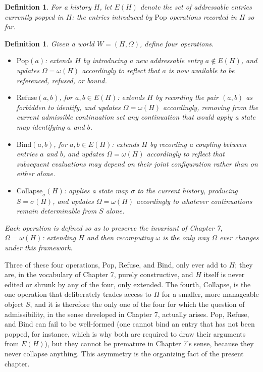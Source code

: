 \documentclass[11pt]{book}
\newtheorem{definition}[theorem]{Definition}
\begin{document}
\begin{definition}
For a history $H$, let $E(H)$ denote the set of addressable entries currently popped in $H$: the entries introduced by $\mathrm{Pop}$ operations recorded in $H$ so far.
\end{definition}

\begin{definition}
Given a world $W=(H,\Omega)$, define four operations.
\begin{itemize}
\item $\mathrm{Pop}(a)$: extends $H$ by introducing a new addressable entry $a\notin E(H)$, and updates $\Omega=\omega(H)$ accordingly to reflect that $a$ is now available to be referenced, refused, or bound.
\item $\mathrm{Refuse}(a,b)$, for $a,b\in E(H)$: extends $H$ by recording the pair $(a,b)$ as forbidden to identify, and updates $\Omega=\omega(H)$ accordingly, removing from the current admissible continuation set any continuation that would apply a state map identifying $a$ and $b$.
\item $\mathrm{Bind}(a,b)$, for $a,b\in E(H)$: extends $H$ by recording a coupling between entries $a$ and $b$, and updates $\Omega=\omega(H)$ accordingly to reflect that subsequent evaluations may depend on their joint configuration rather than on either alone.
\item $\mathrm{Collapse}_\sigma(H)$: applies a state map $\sigma$ to the current history, producing $S=\sigma(H)$, and updates $\Omega=\omega(H)$ accordingly to whatever continuations remain determinable from $S$ alone.
\end{itemize}
Each operation is defined so as to preserve the invariant of Chapter 7, $\Omega=\omega(H)$: extending $H$ and then recomputing $\omega$ is the only way $\Omega$ ever changes under this framework.
\end{definition}

Three of these four operations, Pop, Refuse, and Bind, only ever add to $H$; they are, in the vocabulary of Chapter 7, purely constructive, and $H$ itself is never edited or shrunk by any of the four, only extended. The fourth, Collapse, is the one operation that deliberately trades access to $H$ for a smaller, more manageable object $S$, and it is therefore the only one of the four for which the question of admissibility, in the sense developed in Chapter 7, actually arises. Pop, Refuse, and Bind can fail to be well-formed (one cannot bind an entry that has not been popped, for instance, which is why both are required to draw their arguments from $E(H)$), but they cannot be premature in Chapter 7's sense, because they never collapse anything. This asymmetry is the organizing fact of the present chapter.
\end{document}
